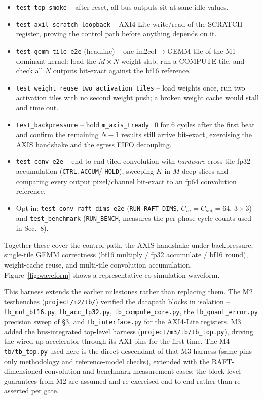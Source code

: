 \documentclass[11pt]{article}
\begin{document}
\begin{itemize}[noitemsep,topsep=2pt]
  \item \texttt{test\_top\_smoke} -- after reset, all bus outputs sit at sane
        idle values.
  \item \texttt{test\_axil\_scratch\_loopback} -- AXI4-Lite write/read of the
        SCRATCH register, proving the control path before anything depends on
        it.
  \item \texttt{test\_gemm\_tile\_e2e} (headline) -- one im2col$\rightarrow$GEMM
        tile of the M1 dominant kernel: load the $M\times N$ weight slab, run a
        COMPUTE tile, and check all $N$ outputs bit-exact against the bf16
        reference.
  \item \texttt{test\_weight\_reuse\_two\_activation\_tiles} -- load weights
        once, run two activation tiles with no second weight push; a broken
        weight cache would stall and time out.
  \item \texttt{test\_backpressure} -- hold \texttt{m\_axis\_tready}=0 for 6
        cycles after the first beat and confirm the remaining $N{-}1$ results
        still arrive bit-exact, exercising the AXIS handshake and the egress
        FIFO decoupling.
  \item \texttt{test\_conv\_e2e} -- end-to-end tiled convolution with
        \emph{hardware} cross-tile fp32 accumulation (\texttt{CTRL.ACCUM}/%
        \texttt{HOLD}), sweeping $K$ in $M$-deep slices and comparing every
        output pixel/channel bit-exact to an fp64 convolution reference.
  \item Opt-in: \texttt{test\_conv\_raft\_dims\_e2e}
        (\texttt{RUN\_RAFT\_DIMS}, $C_{in}{=}C_{out}{=}64$, $3\times3$) and
        \texttt{test\_benchmark} (\texttt{RUN\_BENCH}, measures the per-phase
        cycle counts used in Sec.~8).
\end{itemize}

Together these cover the control path, the AXIS handshake under backpressure,
single-tile GEMM correctness (bf16 multiply / fp32 accumulate / bf16 round),
weight-cache reuse, and multi-tile convolution accumulation.
Figure~\ref{fig:waveform} shows a representative co-simulation waveform.

This harness extends the earlier milestones rather than replacing them. The M2
testbenches (\texttt{project/m2/tb/}) verified the datapath blocks in isolation
-- \texttt{tb\_mul\_bf16.py}, \texttt{tb\_acc\_fp32.py},
\texttt{tb\_compute\_core.py}, the \texttt{tb\_quant\_error.py} precision sweep
of \S3, and \texttt{tb\_interface.py} for the AXI4-Lite registers. M3 added the
bus-integrated top-level harness (\texttt{project/m3/tb/tb\_top.py}), driving
the wired-up accelerator through its AXI pins for the first time. The M4
\texttt{tb/tb\_top.py} used here is the direct descendant of that M3 harness
(same pins-only methodology and reference-model checks), extended with the
RAFT-dimensioned convolution and benchmark-measurement cases; the block-level
guarantees from M2 are assumed and re-exercised end-to-end rather than
re-asserted per gate.
\end{document}
